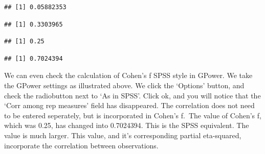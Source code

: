 \documentclass[]{book}
\newenvironment{Shaded}{\begin{snugshade}}{\end{snugshade}}
\newcommand{\DecValTok}[1]{\textcolor[rgb]{0.00,0.00,0.81}{#1}}
\newcommand{\KeywordTok}[1]{\textcolor[rgb]{0.13,0.29,0.53}{\textbf{#1}}}
\newcommand{\NormalTok}[1]{#1}
\newcommand{\OperatorTok}[1]{\textcolor[rgb]{0.81,0.36,0.00}{\textbf{#1}}}
\begin{document}
\begin{verbatim}
## [1] 0.05882353
\end{verbatim}

\begin{Shaded}
\end{Shaded}

\begin{verbatim}
## [1] 0.3303965
\end{verbatim}

\begin{Shaded}
\end{Shaded}

\begin{verbatim}
## [1] 0.25
\end{verbatim}

\begin{Shaded}
\end{Shaded}

\begin{verbatim}
## [1] 0.7024394
\end{verbatim}

We can even check the calculation of Cohen's f SPSS style in GPower. We take the GPower settings as illustrated above. We click the `Options' button, and check the radiobutton next to `As in SPSS'. Click ok, and you will notice that the `Corr among rep measures' field has disappeared. The correlation does not need to be entered seperately, but is incorporated in Cohen's f.~The value of Cohen's f, which was 0.25, has changed into 0.7024394. This is the SPSS equivalent. The value is much larger. This value, and it's corresponding partial eta-squared, incorporate the correlation between observations.
\end{document}
